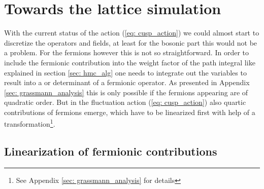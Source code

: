 \chapter{Towards the lattice simulation}
\label{sec: towards_lat}
With the current status of the action (\ref{eq: cusp_action}) we could almost start to discretize the operators and fields, at least for the bosonic part this would not be a problem. For the fermions however this is not so straightforward. In order to include the fermionic contribution into the weight factor of the path integral like explained in section \ref{sec: hmc_alg} one needs to integrate out the  variables to result into a  or determinant of a fermionic operator. As presented in Appendix \ref{sec: grassmann_analysis} this is only possible if the fermions appearing are of quadratic order. But in the fluctuation action (\ref{eq: cusp_action}) also quartic contributions of fermions emerge, which have to be linearized first with help of a  transformation\footnote{See Appendix \ref{sec: grassmann_analysis} for details}.
%
%
%
%
%
%
\section{Linearization of fermionic contributions}
